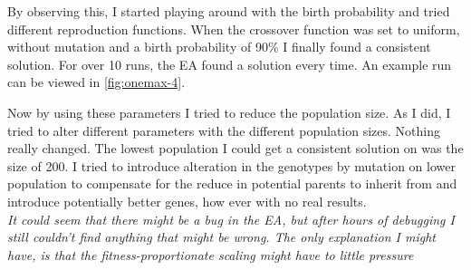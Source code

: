 
By observing this, I started playing around with the birth probability and tried different reproduction functions.
When the crossover function was set to uniform, without mutation and a birth probability of 90\% I finally found
a consistent solution. For over 10 runs, the EA found a solution every time. An example run can be viewed in
\autoref{fig:onemax-4}. 


Now by using these parameters I tried to reduce the population size. As I did, I tried to alter different 
parameters with the different population sizes. Nothing really changed. The lowest population I could get
a consistent solution on was the size of 200. I tried to introduce alteration in the genotypes by mutation
on lower population to compensate for the reduce in potential parents to inherit from and introduce 
potentially better genes, how ever with no real results. \\

\textit{It could seem that there might be a bug in the EA, but after hours of debugging I still couldn't find anything
that might be wrong. The only explanation I might have, is that the fitness-proportionate scaling might have to little
pressure }
